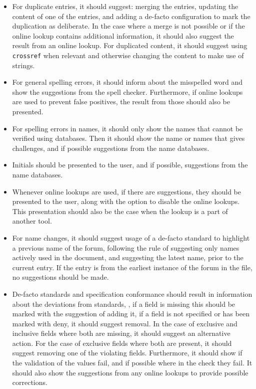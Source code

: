 \begin{itemize}
\item For duplicate entries, it should suggest: merging the entries,
  updating the content of one of the entries, and adding a de-facto
  configuration to mark the duplication as deliberate.  In the case
  where a merge is not possible or if the online lookup contains
  additional information, it should also suggest the result from an
  online lookup.  For duplicated content, it should suggest using
  \texttt{crossref} when relevant and otherwise changing the content
  to make use of strings.

\item For general spelling errors, it should inform about the
  misspelled word and show the suggestions from the spell checker.
  Furthermore, if online lookups are used to prevent false positives,
  the result from those should also be presented.

\item For spelling errors in names, it should only show the names that
  cannot be verified using databases.  Then it should show the name or
  names that gives challenges, and if possible suggestions from the
  name databases.

\item Initials should be presented to the user, and if possible,
  suggestions from the name databases.

\item Whenever online lookups are used, if there are suggestions, they
  should be presented to the user, along with the option to disable
  the online lookups.  This presentation should also be the case when
  the lookup is a part of another tool.

\item For name changes, it should suggest usage of a de-facto standard
  to highlight a previous name of the forum, following the rule of
  suggesting only names actively used in the document, and suggesting
  the latest name, prior to the current entry.  If the entry is from
  the earliest instance of the forum in the file, no suggestions
  should be made.

\item De-facto standards and specification conformance should result
  in information about the deviations from standards, \ie, if a field
  is missing this should be marked with the suggestion of adding it,
  if a field is not specified or has been marked with deny, it should
  suggest removal.  In the case of exclusive and inclusive fields
  where both are missing, it should suggest an alternative action.  For
  the case of exclusive fields where both are present, it should
  suggest removing one of the violating fields.  Furthermore, it
  should show if the validation of the values fail, and if possible
  where in the check they fail.  It should also show the suggestions
  from any online lookups to provide possible corrections.


\end{itemize}

